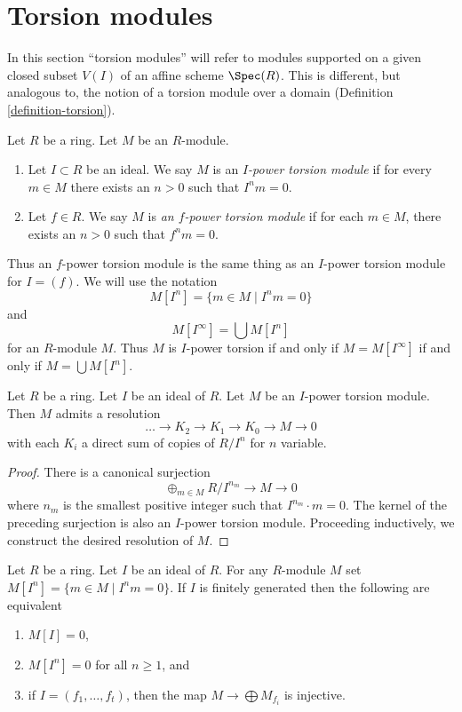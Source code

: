 \section{Torsion modules}
\label{section-torsion}

\noindent
In this section ``torsion modules'' will refer to modules supported
on a given closed subset $V(I)$ of an affine scheme $\Spec(R)$.
This is different, but analogous to, the notion of a torsion module
over a domain (Definition \ref{definition-torsion}).

\begin{definition}
\label{definition-f-power-torsion}
Let $R$ be a ring. Let $M$ be an $R$-module.
\begin{enumerate}
\item Let $I \subset R$ be an ideal. We say $M$ is an
{\it $I$-power torsion module} if for every $m \in M$ there exists an $n > 0$
such that $I^n m = 0$.
\item Let $f \in R$. We say $M$ is
{\it an $f$-power torsion module} if for each
$m \in M$, there exists an $n > 0$ such that $f^n m = 0$.
\end{enumerate}
\end{definition}

\noindent
Thus an $f$-power torsion module is the same thing as an $I$-power torsion
module for $I = (f)$. We will use the notation
$$
M[I^n] = \{m \in M \mid I^nm = 0\}
$$
and
$$
M[I^\infty] = \bigcup M[I^n]
$$
for an $R$-module $M$. Thus $M$ is $I$-power torsion if and only if
$M = M[I^\infty]$ if and only if $M = \bigcup M[I^n]$.

\begin{lemma}
\label{lemma-I-power-torsion-presentation}
Let $R$ be a ring.
Let $I$ be an ideal of $R$.
Let $M$ be an $I$-power torsion module.
Then $M$ admits a resolution
$$
\ldots \to K_2 \to K_1 \to K_0 \to M \to 0
$$
with each $K_i$ a direct sum of copies of $R/I^n$ for $n$ variable.
\end{lemma}

\begin{proof}
There is a canonical surjection
$$
\oplus_{m \in M} R/I^{n_m} \to M \to 0
$$
where $n_m$ is the smallest positive integer such that $I^{n_m} \cdot m = 0$.
The kernel of the preceding surjection is also an $I$-power torsion module.
Proceeding inductively, we construct the desired resolution of $M$.
\end{proof}

\begin{lemma}
\label{lemma-torsion-free}
Let $R$ be a ring. Let $I$ be an ideal of $R$.
For any $R$-module $M$ set $M[I^n] = \{m \in M \mid I^nm = 0\}$.
If $I$ is finitely generated then the following are equivalent
\begin{enumerate}
\item $M[I] = 0$,
\item $M[I^n] = 0$ for all $n \geq 1$, and
\item if $I = (f_1, \ldots, f_t)$, then the map
$M \to \bigoplus M_{f_i}$ is injective.
\end{enumerate}
\end{lemma}


